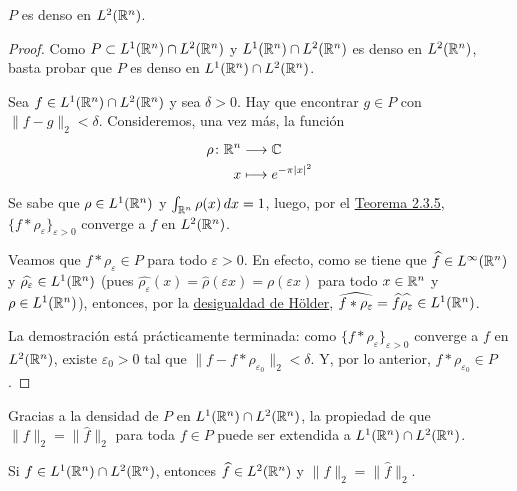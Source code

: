 \documentclass[a4paper, 11pt, oneside]{report}
\begin{document}
\begin{theorem}\label{teo:3.3.2}
  $P$ es denso en $L^2(\mathbb R^n)$.
\end{theorem}

\begin{proof}
  Como $P \subset L^1(\mathbb R^n) \cap L^2(\mathbb R^n)$ y $L^1(\mathbb R^n) \cap L^2(\mathbb R^n)$ es denso en $L^2(\mathbb R^n)$, basta probar que $P$ es denso en $L^1(\mathbb R^n) \cap L^2(\mathbb R^n)$.

  Sea $f \in L^1(\mathbb R^n) \cap L^2(\mathbb R^n)$ y sea $\delta > 0$. Hay que encontrar $g \in P$ con $\|f-g\|_2 < \delta$. Consideremos, una vez más, la función
  \[
    \begin{aligned}[t]
    \rho \colon \mathbb R^n &\longrightarrow \mathbb C \\
    x &\longmapsto e^{-\pi |x|^2}
    \end{aligned}
  \]
  Se sabe que $\rho \in L^1(\mathbb R^n)$ y $\int_{\mathbb R^n} \rho(x) \, dx = 1$, luego, por el \hyperref[teo:2.3.5]{\color{c1}Teorema 2.3.5}, $\{f \ast \rho_\varepsilon\}_{\varepsilon > 0}$ converge a $f$ en $L^2(\mathbb R^n)$.

  Veamos que $f \ast \rho_\varepsilon \in P$ para todo $\varepsilon > 0$. En efecto, como se tiene que $\widehat{f} \in L^\infty(\mathbb R^n)$ y $\widehat{\rho_\varepsilon} \in L^1(\mathbb R^n)$ (pues $\widehat{\rho_\varepsilon}(x) = \widehat{\rho}(\varepsilon x) = \rho(\varepsilon x)$ para todo $x \in \mathbb R^n$ y $\rho \in L^1(\mathbb R^n)$), entonces, por la \hyperref[cor:1.4.4]{\color{c1}desigualdad de Hölder}, $\widehat{f \ast \rho_\varepsilon}  = \widehat{f} \widehat{\vphantom{f}\rho_\varepsilon} \in L^1(\mathbb R^n)$.

  La demostración está prácticamente terminada: como $\{f \ast \rho_\varepsilon\}_{\varepsilon > 0}$ converge a $f$ en $L^2(\mathbb R^n)$, existe $\varepsilon_0 > 0$ tal que $\|f - f \ast \rho_{\varepsilon_0}\|_2 < \delta$. Y, por lo anterior, $f \ast \rho_{\varepsilon_0} \in P$.
\end{proof}

Gracias a la densidad de $P$ en $L^1(\mathbb R^n) \cap L^2(\mathbb R^n)$, la propiedad de que $\|f\|_2=\|\widehat{f}\|_2$ para toda $f \in P$ puede ser extendida a $L^1(\mathbb R^n) \cap L^2(\mathbb R^n)$.

\begin{theorem}
  Si $f \in L^1(\mathbb R^n) \cap L^2(\mathbb R^n)$, entonces $\widehat{f} \in L^2(\mathbb R^n)$ y $\|f\|_2=\|\widehat{f}\|_2$.
\end{theorem}
\end{document}
